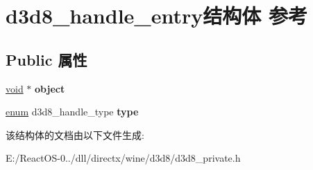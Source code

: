 \hypertarget{structd3d8__handle__entry}{}\section{d3d8\+\_\+handle\+\_\+entry结构体 参考}
\label{structd3d8__handle__entry}
\subsection*{Public 属性}
\begin{DoxyCompactItemize}
\item 
\mbox{\label{structd3d8__handle__entry_af6d240cf180e9393ee7ede137deca1bd}} 
\hyperlink{interfacevoid}{void} $\ast$ {\bfseries object}
\item 
\mbox{\label{structd3d8__handle__entry_a6ce826fe1b7870cb53f14bbe332cc43e}} 
\hyperlink{interfaceenum}{enum} d3d8\+\_\+handle\+\_\+type {\bfseries type}
\end{DoxyCompactItemize}


该结构体的文档由以下文件生成\+:\begin{DoxyCompactItemize}
\item 
E\+:/\+React\+O\+S-\/0../dll/directx/wine/d3d8/d3d8\+\_\+private.\+h\end{DoxyCompactItemize}
